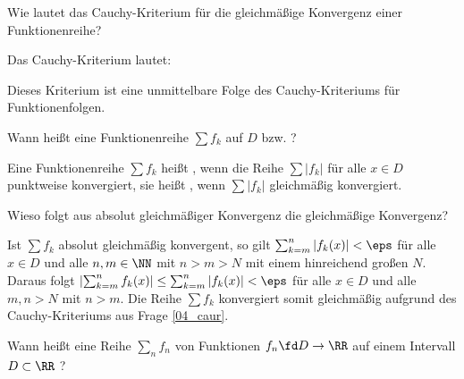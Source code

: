 \begin{frage}\label{04_caur}
Wie lautet das Cauchy-Kriterium für die gleichmäßige Konvergenz einer 
Funktionenreihe?
\end{frage}

\begin{antwort}
Das Cauchy-Kriterium lautet: 

\medskip
\noindent{}
\noindent
Dieses Kriterium ist eine unmittelbare Folge des Cauchy-Kriteriums 
für Funktionenfolgen.  
\AntEnd
\end{antwort}

\begin{frage}
Wann heißt eine Funktionenreihe $\sum f_k$ auf $D$  
bzw. ?
\end{frage}

\begin{antwort}
Eine Funktionenreihe $\sum f_k$ heißt 
, wenn die 
Reihe $\sum |f_k|$ für alle $x\in D$ punktweise konvergiert, 
sie heißt , 
wenn $\sum |f_k|$ gleichmäßig konvergiert.
\AntEnd
\end{antwort}

\begin{frage}\label{04_abgl}
Wieso folgt aus absolut gleichmäßiger Konvergenz die gleichmäßige 
Konvergenz?
\end{frage}

\begin{antwort}
Ist $\sum f_k$ absolut gleichmäßig konvergent, so gilt  
$\sum_{k=m}^n |f_k(x)|<\eps$ für alle 
$x\in D$ und alle $n,m\in\NN$ mit $n>m>N$ mit einem hinreichend großen 
$N$. Daraus folgt $
\left| \sum_{k=m}^n f_k(x) \right| \le 
\sum_{k=m}^n |f_k(x)| < \eps$ für alle $x\in D$ und alle 
$m,n>N$ mit $n>m$. 
Die Reihe $\sum f_k$ konvergiert somit gleichmäßig aufgrund des 
Cauchy-Kriteriums aus Frage \ref{04_caur}.
\AntEnd 
\end{antwort}

\begin{frage}
Wann heißt eine Reihe $\sum_n f_n$ von Funktionen 
$f_n \fd D\to \RR$ auf einem Intervall $D\subset\RR$ 
?
\end{frage}

